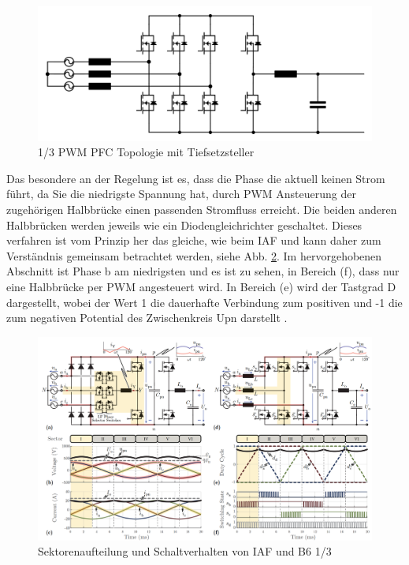 	\begin{figure}
		\centering
		\includegraphics[width=0.9\linewidth]{content/Grafiken/B6_Buck}
		\caption[1/3 PWM PFC Topologie mit Tiefsetzsteller]{1/3 PWM PFC Topologie mit Tiefsetzsteller}
		\label{fig:b6buck}
	\end{figure}
	
	Das besondere an der Regelung ist es, dass die Phase die aktuell keinen Strom führt, da Sie die niedrigste Spannung hat, durch \gls{PWM} Ansteuerung der zugehörigen Halbbrücke einen passenden Stromfluss erreicht. Die beiden anderen Halbbrücken werden jeweils wie ein Diodengleichrichter geschaltet. Dieses verfahren ist vom Prinzip her das gleiche, wie beim \gls{IAF} und kann daher zum Verständnis gemeinsam betrachtet werden, siehe Abb. \ref{fig:b6iafsectors}.
	Im hervorgehobenen Abschnitt ist Phase b am niedrigsten und es ist zu sehen, in Bereich (f), dass nur eine Halbbrücke per \gls{PWM} angesteuert wird. In Bereich (e) wird der Tastgrad \gls{D} dargestellt, wobei der Wert 1 die dauerhafte Verbindung zum positiven und -1 die zum negativen Potential des Zwischenkreis \gls{Upn} darstellt \cite{13PWMPFC}.\\ 
	
	\begin{figure}
		\centering
		\includegraphics[width=0.9\linewidth]{content/Grafiken/B6+IAF_Sectors.png}
		\caption{Sektorenaufteilung und Schaltverhalten von IAF und B6 1/3 \cite{13PWMPFC}}
		\label{fig:b6iafsectors}
	\end{figure}

